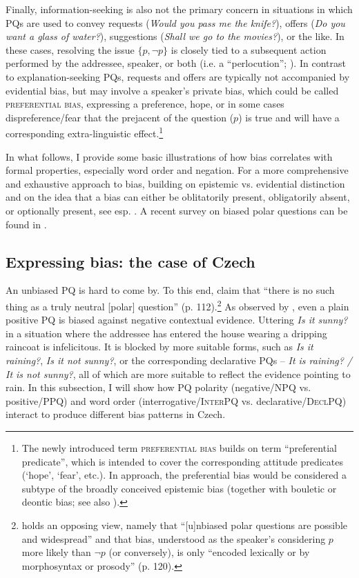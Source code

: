 \documentclass[output=paper,colorlinks,citecolor=brown]{langscibook}
\begin{document}
Finally, information-seeking is also not the primary concern in situations in which PQs are used to convey requests (\textit{Would you pass me the knife?}), offers (\textit{Do you want a glass of water?}), suggestions (\textit{Shall we go to the movies?}), or the like. In these cases, resolving the issue $\{p,\neg p\}$ is closely tied to a subsequent action performed by the addressee, speaker, or both (i.e. a ``perlocution''; \citealt{Austin1962}). In contrast to explanation-seeking PQs, requests and offers are typically not accompanied by evidential bias, but may involve a speaker's private bias, which could be called \textsc{preferential bias}, expressing a preference, hope, or in some cases dispreference/fear that the prejacent of the question ($p$) is true and will have a corresponding extra-linguistic effect.\footnote{The newly introduced term \textsc{preferential bias} builds on  term ``preferential predicate'', which is intended to cover the corresponding attitude predicates (`hope', `fear', etc.). In  approach, the preferential bias would be considered a subtype of the broadly conceived epistemic bias (together with bouletic or deontic bias; see also \citealt{Reese.Asher2010}).}

In what follows, I provide some basic illustrations of how bias correlates with formal properties, especially word order and negation. For a more comprehensive and exhaustive approach to bias, building on  epistemic vs. evidential distinction and on the idea that a bias can either be oblitatorily present, obligatorily absent, or optionally present, see esp. \citet{Gartner.Gyuris2017}. A recent survey on biased polar questions can be found in \citet{Romero2024}.

\subsection{Expressing bias: the case of Czech}\label{sim:sec:bias-cz}

An unbiased PQ is hard to come by. To this end, \citet{Repp.Geist2025} claim that ``there is no such thing as a truly neutral [polar] question'' (p. 112).\footnote{\citet{Zimmerling2023} holds an opposing view, namely that ``[u]nbiased polar questions are possible and widespread'' and that bias, understood as the speaker's considering $p$ more likely than $\neg p$ (or conversely), is only ``encoded lexically or by morphosyntax or prosody'' (p. 120).} As observed by \citet{Buring.Gunlogson2000}, even a plain positive PQ is biased against negative contextual evidence. Uttering \textit{Is it sunny?} in a situation where the addressee has entered the house wearing a dripping raincoat is infelicitous. It is blocked by more suitable forms, such as \textit{Is it raining?}, \textit{Is it not sunny?}, or the corresponding declarative PQs -- \textit{It is raining? / It is not sunny?}, all of which are more suitable to reflect the evidence pointing to rain. In this subsection, I will show how PQ polarity (negative/NPQ vs. positive/PPQ) and word order (interrogative/\textsc{InterPQ} vs. declarative/\textsc{DeclPQ}) interact to produce different bias patterns in Czech.
\end{document}
